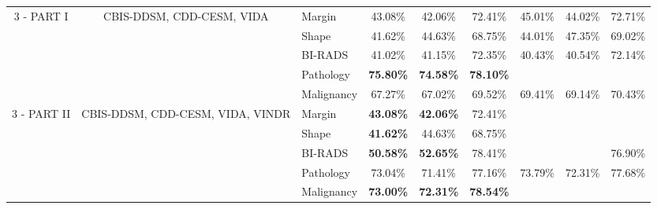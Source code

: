 \documentclass[11pt,a4paper]{article}
\begin{document}
\begin{table}[!ht]
\begin{adjustbox}{width=\textwidth}
\begin{tabular}{cclcccccc}
\midrule
\multirow{5}{*}{3 - PART I}  & \multirow{5}{*}{CBIS-DDSM, CDD-CESM, VIDA}        & Margin     & 43.08\%  & 42.06\%  & 72.41\% & 45.01\% & 44.02\% & 72.71\% \\
                             &                                                   & Shape      & 41.62\%  & 44.63\%  & 68.75\% & 44.01\% & 47.35\% & 69.02\% \\
                             &                                                   & BI-RADS    & 41.02\%  & 41.15\%  & 72.35\% & 40.43\% & 40.54\% & 72.14\% \\
                             &                                                   & Pathology  & \textbf{75.80\%}  & \textbf{74.58\%}  & \textbf{78.10\%} & \textbf{\color{darkgreen}{75.16\%}} & \textbf{\color{darkgreen}{73.98\%}} & \textbf{\color{darkgreen}{78.61\%}} \\
                             &                                                   & Malignancy & 67.27\%  & 67.02\%  & 69.52\% & 69.41\% & 69.14\% & 70.43\% \\
\midrule
\multirow{5}{*}{3 - PART II} & \multirow{5}{*}{CBIS-DDSM, CDD-CESM, VIDA, VINDR} & Margin     & \textbf{43.08\%}  & \textbf{42.06\%}  & 72.41\% & \textbf{\color{darkgreen}{45.01\%}} & \textbf{\color{darkgreen}{44.02\%}} & \textbf{\color{darkgreen}{72.71\%}} \\
                             &                                                   & Shape      & \textbf{41.62\%}  & 44.63\%  & 68.75\% & \textbf{\color{darkgreen}{44.01\%}} & \textbf{\color{darkgreen}{47.35\%}} & \textbf{\color{darkgreen}{69.02\%}} \\
                             &                                                   & BI-RADS    & \textbf{50.58\%}  & \textbf{52.65\%}  & 78.41\% & \textbf{\color{darkgreen}{51.71\%}} & \textbf{\color{darkgreen}{53.56\%}} & 76.90\% \\
                             &                                                   & Pathology  & 73.04\%  & 71.41\%  & 77.16\% & 73.79\% & 72.31\% & 77.68\% \\
                             &                                                   & Malignancy & \textbf{73.00\%}  & \textbf{72.31\%}  & \textbf{78.54\%} & \textbf{\color{darkgreen}{74.30\%}} & \textbf{\color{darkgreen}{73.68\%}} & \textbf{\color{darkgreen}{79.58\%}} \\
\bottomrule
\end{tabular}
\end{adjustbox}
\end{table}
\
\end{document}
